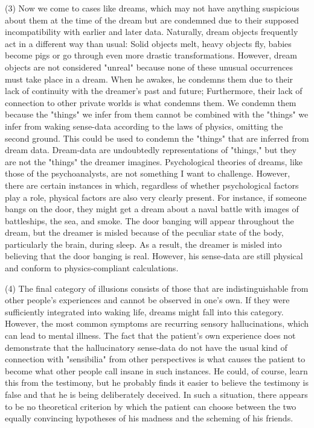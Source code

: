 \documentclass[a4paper,12pt]{book}[2004/02/16]
\theoremstyle{ilemma}
\theoremstyle{itheorem}
\theoremstyle{iother}
\theoremstyle{icorollary}
\theoremstyle{numcorollary}
\theoremstyle{idefinition}
\begin{document}
(3) Now we come to cases like dreams, which may not have anything suspicious about them at the time of the dream but are condemned due to their supposed incompatibility with earlier and later data. Naturally, dream objects frequently act in a different way than usual: Solid objects melt, heavy objects fly, babies become pigs or go through even more drastic transformations. However, dream objects are not considered "unreal" because none of these unusual occurrences must take place in a dream. When he awakes, he condemns them due to their lack of continuity with the dreamer's past and future; Furthermore, their lack of connection to other private worlds is what condemns them. We condemn them because the "things" we infer from them cannot be combined with the "things" we infer from waking sense-data according to the laws of physics, omitting the second ground. This could be used to condemn the "things" that are inferred from dream data. Dream-data are undoubtedly representations of "things," but they are not the "things" the dreamer imagines. Psychological theories of dreams, like those of the psychoanalysts, are not something I want to challenge. However, there are certain instances in which, regardless of whether psychological factors play a role, physical factors are also very clearly present. For instance, if someone bangs on the door, they might get a dream about a naval battle with images of battleships, the sea, and smoke. The door banging will appear throughout the dream, but the dreamer is misled because of the peculiar state of the body, particularly the brain, during sleep. As a result, the dreamer is misled into believing that the door banging is real. However, his sense-data are still physical and conform to physics-compliant calculations.

(4) The final category of illusions consists of those that are indistinguishable from other people's experiences and cannot be observed in one's own. If they were sufficiently integrated into waking life, dreams might fall into this category. However, the most common symptoms are recurring sensory hallucinations, which can lead to mental illness. The fact that the patient's own experience does not demonstrate that the hallucinatory sense-data do not have the usual kind of connection with "sensibilia" from other perspectives is what causes the patient to become what other people call insane in such instances. He could, of course, learn this from the testimony, but he probably finds it easier to believe the testimony is false and that he is being deliberately deceived. In such a situation, there appears to be no theoretical criterion by which the patient can choose between the two equally convincing hypotheses of his madness and the scheming of his friends.
\end{document}
